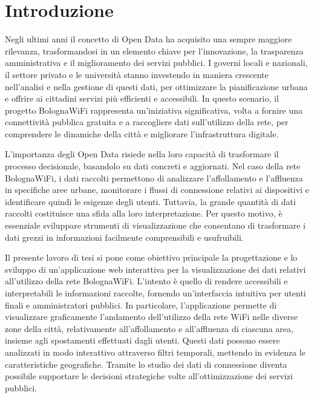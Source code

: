 \chapter*{Introduzione}



Negli ultimi anni il concetto di Open Data ha acquisito una sempre maggiore rilevanza, trasformandosi in un elemento chiave per l'innovazione, la trasparenza amministrativa e il miglioramento dei servizi pubblici. I governi locali e nazionali, il settore privato e le università stanno investendo in maniera crescente nell'analisi e nella gestione di questi dati, per ottimizzare la pianificazione urbana e offrire ai cittadini servizi più efficienti e accessibili. In questo scenario, il progetto BolognaWiFi rappresenta un'iniziativa significativa, volta a fornire una connettività pubblica gratuita e a raccogliere dati sull'utilizzo della rete, per comprendere le dinamiche della città e migliorare l'infrastruttura digitale.

L'importanza degli Open Data risiede nella loro capacità di trasformare il processo decisionale, basandolo su dati concreti e aggiornati. Nel caso della rete BolognaWiFi, i dati raccolti permettono di analizzare l'affollamento e l'affluenza in specifiche aree urbane, monitorare i flussi di connessione relativi ai dispositivi e identificare quindi le esigenze degli utenti. Tuttavia, la grande quantità di dati raccolti costituisce una sfida alla loro interpretazione. Per questo motivo, è essenziale sviluppare strumenti di visualizzazione che consentano di trasformare i dati grezzi in informazioni facilmente comprensibili e usufruibili.

Il presente lavoro di tesi si pone come obiettivo principale la progettazione e lo sviluppo di un'applicazione web interattiva per la visualizzazione dei dati relativi all'utilizzo della rete BolognaWiFi. L'intento è quello di rendere accessibili e interpretabili le informazioni raccolte, fornendo un'interfaccia intuitiva per utenti finali e amministratori pubblici. In particolare, l'applicazione permette di visualizzare graficamente l'andamento dell'utilizzo della rete WiFi nelle diverse zone della città, relativamente all'affollamento e all'affluenza di ciascuna area, insieme agli spostamenti effettuati dagli utenti. Questi dati possono essere analizzati in modo interattivo attraverso filtri temporali, mettendo in evidenza le caratteristiche geografiche. Tramite lo studio dei dati di connessione diventa possibile supportare le decisioni strategiche volte all'ottimizzazione dei servizi pubblici.

